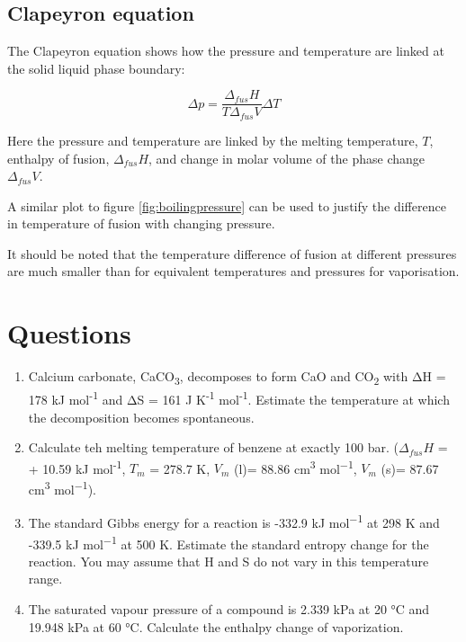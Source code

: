 \documentclass[
]{book}
\begin{document}
\hypertarget{clapeyron-equation}{%
\subsection{Clapeyron equation}\label{clapeyron-equation}}

The Clapeyron equation shows how the pressure and temperature are linked at the solid liquid phase boundary:

\begin{equation}
\Delta p=\frac{\Delta_{fus} H}{T \Delta _{fus}V}\Delta T
\label{eq:clapeyron}
\end{equation}

Here the pressure and temperature are linked by the melting temperature, \(T\), enthalpy of fusion, \(\Delta _{fus}H\), and change in molar volume of the phase change \(\Delta _{fus} V\).

A similar plot to figure \ref{fig:boilingpressure} can be used to justify the difference in temperature of fusion with changing pressure.

It should be noted that the temperature difference of fusion at different pressures are much smaller than for equivalent temperatures and pressures for vaporisation.

\hypertarget{sec:w4p1question}{%
\section{Questions}\label{sec:w4p1question}}

\begin{enumerate}
\def\labelenumi{\arabic{enumi}.}
\item
  Calcium carbonate, CaCO\textsubscript{3}, decomposes to form CaO and CO\textsubscript{2} with ΔH = 178 kJ mol\textsuperscript{-1} and ΔS = 161 J K\textsuperscript{-1} mol\textsuperscript{-1}. Estimate the temperature at which the decomposition becomes spontaneous.
\item
  Calculate teh melting temperature of benzene at exactly 100 bar. (\(\Delta _{fus} H\) = + 10.59 kJ mol\textsuperscript{-1}, \(T_m\) = 278.7 K, \(V_m\) (l)= 88.86 cm\textsuperscript{3} mol\textsuperscript{−1}, \(V_m\) (s)= 87.67 cm\textsuperscript{3} mol\textsuperscript{−1}).
\item
  The standard Gibbs energy for a reaction is -332.9 kJ mol\textsuperscript{−1} at 298 K and -339.5 kJ mol\textsuperscript{−1} at 500 K. Estimate the standard entropy change for the reaction. You may assume that H and S do not vary in this temperature range.
\item
  The saturated vapour pressure of a compound is 2.339 kPa at 20 °C and 19.948 kPa at 60 °C. Calculate the enthalpy change of vaporization.
\end{enumerate}
\end{document}
